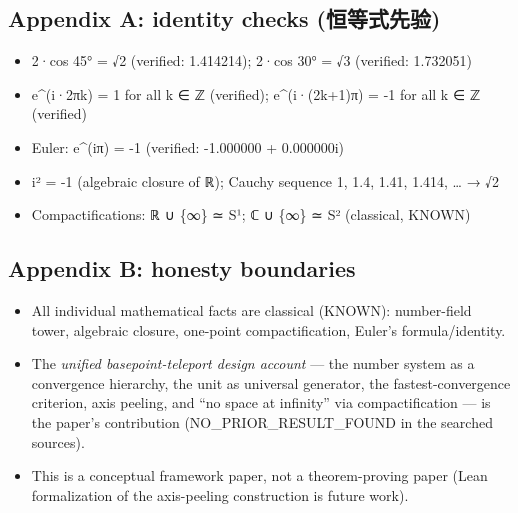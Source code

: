 \documentclass[
]{article}
\providecommand{\tightlist}{%
  \setlength{\itemsep}{0pt}\setlength{\parskip}{0pt}}
\begin{document}
\subsection{Appendix A: identity checks
(恒等式先验)}\label{appendix-a-identity-checks-ux6052ux7b49ux5f0fux5148ux9a8c}

\begin{itemize}
\tightlist
\item
  2·cos 45° = √2 (verified: 1.414214); 2·cos 30° = √3 (verified:
  1.732051)
\item
  e\^{}(i·2πk) = 1 for all k ∈ ℤ (verified); e\^{}(i·(2k+1)π) = -1 for
  all k ∈ ℤ (verified)
\item
  Euler: e\^{}(iπ) = -1 (verified: -1.000000 + 0.000000i)
\item
  i² = -1 (algebraic closure of ℝ); Cauchy sequence 1, 1.4, 1.41, 1.414,
  \ldots{} → √2
\item
  Compactifications: ℝ ∪ \{∞\} ≃ S¹; ℂ ∪ \{∞\} ≃ S² (classical, KNOWN)
\end{itemize}

\subsection{Appendix B: honesty
boundaries}\label{appendix-b-honesty-boundaries}

\begin{itemize}
\tightlist
\item
  All individual mathematical facts are classical (KNOWN): number-field
  tower, algebraic closure, one-point compactification, Euler's
  formula/identity.
\item
  The \emph{unified basepoint-teleport design account} --- the number
  system as a convergence hierarchy, the unit as universal generator,
  the fastest-convergence criterion, axis peeling, and ``no space at
  infinity'' via compactification --- is the paper's contribution
  (NO\_PRIOR\_RESULT\_FOUND in the searched sources).
\item
  This is a conceptual framework paper, not a theorem-proving paper
  (Lean formalization of the axis-peeling construction is future work).
\end{itemize}
\end{document}
